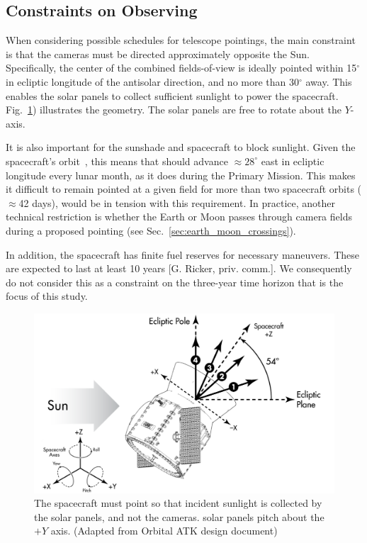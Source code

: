 \subsection{Constraints on \tesss Observing}
\label{sec:constraints_on_pointings}

When considering possible schedules for telescope pointings, the main
constraint is that the cameras must be directed approximately opposite
the Sun.  Specifically, the center of the combined fields-of-view is
ideally pointed within 15$^\circ$ in ecliptic longitude of the antisolar 
direction, and no more than 30$^\circ$ away.
This enables the solar panels to collect
sufficient sunlight to power the spacecraft.
Fig.~\ref{fig:spacecraft_angles}) illustrates the geometry. The solar
panels are free to rotate about the $Y$-axis.

It is also important for the sunshade and 
spacecraft to block sunlight.
Given the spacecraft's orbit~\citep{gangestad_high_2013},
this means that \tess should advance $\approx$$28^\circ$ east in ecliptic
longitude every lunar month, as it does during the Primary Mission.
This makes it difficult to remain pointed at a given field for more than two spacecraft orbits ($\approx$42
days), would be in tension with this requirement.  In practice,
another technical restriction is whether the Earth or Moon passes
through \tesss camera fields during a proposed pointing (see
Sec.~\ref{sec:earth_moon_crossings}).

In addition, the spacecraft has finite fuel reserves for necessary maneuvers.
These are expected to last at least 10 years [G. Ricker, priv. comm.]. We 
consequently do not consider this as a constraint on the three-year time 
horizon that is the focus of this study.

\begin{figure}[!b]
	\centering
	\includegraphics{figures/spacecraft_angles_corr.pdf}
	\caption{The spacecraft must point so that incident sunlight is collected 
		by the solar panels, and not the cameras. \tesss solar panels pitch 
		about the $+Y$ axis. (Adapted from Orbital ATK design document) }
	\label{fig:spacecraft_angles}
\end{figure}
